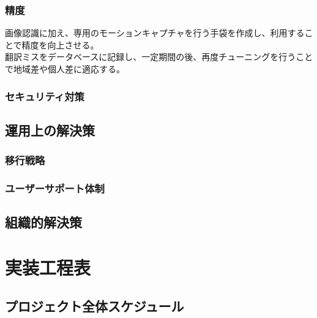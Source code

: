 \documentclass[12pt,a4paper]{jsarticle}
\begin{document}
\subsubsection{精度}
画像認識に加え、専用のモーションキャプチャを行う手袋を作成し、利用することで精度を向上させる。\\
翻訳ミスをデータベースに記録し、一定期間の後、再度チューニングを行うことで地域差や個人差に適応する。\\
\subsubsection{セキュリティ対策}

\subsection{運用上の解決策}

\subsubsection{移行戦略}

\subsubsection{ユーザーサポート体制}

\subsection{組織的解決策}

\section{実装工程表}

\subsection{プロジェクト全体スケジュール}
\end{document}
